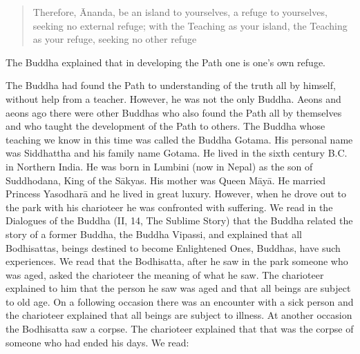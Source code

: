 \documentclass{book}
\begin{document}
\begin{quote}
Therefore, Ānanda, be an island to yourselves, a refuge to yourselves,
seeking no external refuge; with the Teaching as your island, the
Teaching as your refuge, seeking no other refuge
\end{quote}

The Buddha explained that in developing the Path one is one's own
refuge.

The Buddha had found the Path to understanding of the truth all by
himself, without help from a teacher. However, he was not the only
Buddha. Aeons and aeons ago there were other Buddhas who also found the
Path all by themselves and who taught the development of the Path to
others. The Buddha whose teaching we know in this time was called the
Buddha Gotama. His personal name was Siddhattha and his family name
Gotama. He lived in the sixth century B.C. in Northern India. He was
born in Lumbini (now in Nepal) as the son of Suddhodana, King of the
Sākyas. His mother was Queen Māyā. He married Princess Yasodharā and he
lived in great luxury. However, when he drove out to the park with his
charioteer he was confronted with suffering. We read in the Dialogues of
the Buddha (II, 14, The Sublime Story) that the Buddha related the story
of a former Buddha, the Buddha Vipassi, and explained that all
Bodhisattas, beings destined to become Enlightened Ones, Buddhas, have
such experiences. We read that the Bodhisatta, after he saw in the park
someone who was aged, asked the charioteer the meaning of what he saw.
The charioteer explained to him that the person he saw was aged and that
all beings are subject to old age. On a following occasion there was an
encounter with a sick person and the charioteer explained that all
beings are subject to illness. At another occasion the Bodhisatta saw a
corpse. The charioteer explained that that was the corpse of someone who
had ended his days. We read:
\end{document}
